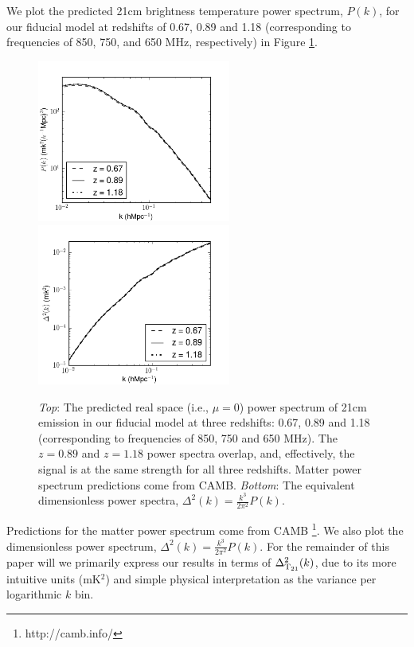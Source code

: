 \documentclass[10pt,iop]{emulateapj}
\begin{document}
We plot the predicted 21cm 
brightness temperature power spectrum, $P(k)$, for our fiducial model 
at redshifts of 0.67, 0.89 and 1.18 (corresponding to frequencies of 850,
750, and 650 MHz, respectively) in Figure \ref{fig:21cmps}.  
\begin{figure}\centering
\includegraphics[width=2.5in]{21cmps-2.png}
\includegraphics[width=2.5in]{21cmdelta-2.png}
\caption{
\emph{Top}: The predicted real space (i.e., $\mu=0$) power spectrum of 21cm 
emission in our fiducial model
at three redshifts:
0.67, 0.89 and 1.18 (corresponding to frequencies of 850, 750 and 650 MHz).  
The $z = 0.89$ and $z = 1.18$ power spectra overlap, and, effectively, the 
signal is at the same strength for all three  
redshifts.  Matter power
spectrum predictions come from CAMB.  \emph{Bottom}: The equivalent 
dimensionless power spectra,
$\Delta^2(k) = \frac{k^3}{2\pi^2}P(k)$.
} \label{fig:21cmps}
\end{figure}
Predictions for the matter power spectrum
come from CAMB \citep{lewis_et_al_2000}\footnote{http://camb.info/}.  
We also plot the dimensionless power
spectrum, $\Delta^2(k) = \frac{k^3}{2\pi^2}P(k)$.  For the remainder of this paper
will we primarily express our results in terms of $\Delta_{\rm{T_{21}}}^2(k)$, due to its more
intuitive units (mK$^2$) and simple physical interpretation as the variance
per logarithmic $k$ bin.
\end{document}
